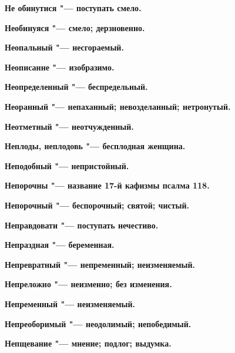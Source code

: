 \begin{multicols}{2}
\bfseries Не обинутися\normalfont{} "--- поступать смело. 




\bfseries Необинуяся\normalfont{} "--- смело; дерзновенно. 




\bfseries Неопальный\normalfont{} "--- несгораемый. 




\bfseries Неописанне\normalfont{} "--- изобразимо. 




\bfseries Неопределенный\normalfont{} "--- беспредельный. 




\bfseries Неоранный\normalfont{} "--- непаханный; невозделанный; нетронутый. 




\bfseries Неотметный\normalfont{} "--- неотчужденный. 




\bfseries Неплоды, неплодовь\normalfont{} "--- бесплодная женщина. 




\bfseries Неподобный\normalfont{} "--- непристойный. 




\bfseries Непорочны\normalfont{} "--- название 17-й кафизмы псалма 118. 




\bfseries Непорочный\normalfont{} "--- беспорочный; святой; чистый. 




\bfseries Неправдовати\normalfont{} "--- поступать нечестиво. 




\bfseries Непраздная\normalfont{} "--- беременная. 




\bfseries Непревратный\normalfont{} "--- непременный; неизменяемый. 




\bfseries Непреложно\normalfont{} "--- неизменно; без изменения. 




\bfseries Непременный\normalfont{} "--- неизменяемый. 




\bfseries Непреоборимый\normalfont{} "--- неодолимый; непобедимый. 




\bfseries Непщевание\normalfont{} "--- мнение; подлог; выдумка. 





\end{multicols}
